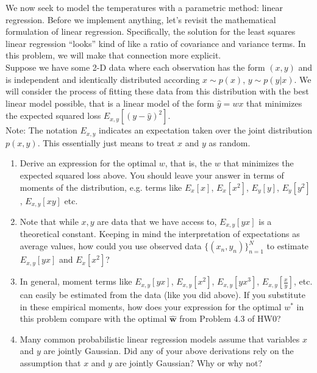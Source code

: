 \documentclass[submit]{harvardml}
\begin{document}
\newpage
\begin{problem}

We now seek to model the temperatures with a parametric method: linear regression. Before we implement anything, let's revisit the mathematical formulation of linear regression.  Specifically, the solution for the least squares linear regression  ``looks'' kind of like a ratio of covariance and
variance terms.  In this problem, we will make that connection more
explicit. \\

\noindent Suppose we have some 2-D data where each observation has the form $(x, y)$ and is independent and identically distributed according  $x \sim p(x)$, $y \sim p(y|x)$. We will consider the process of fitting these data from this distribution with the best linear model
possible, that is a linear model of the form $\hat{y} = wx$ that
minimizes the expected squared loss $E_{x,y}[ ( y - \hat{y} )^2
    ]$.\\

\noindent Note: The notation $E_{x, y}$ indicates an
expectation taken over the joint distribution $p(x,y)$. This essentially just means to treat $x$ and $y$ as random.  

\begin{enumerate}

  \item Derive an expression for the optimal $w$, that is, the $w$
        that minimizes the expected squared loss above.  You should leave
        your answer in terms of moments of the distribution, e.g. terms
        like $E_x[x]$, $E_x[x^2]$, $E_y[y]$, $E_y[y^2]$, $E_{x,y}[xy]$
        etc.

  \item Note that while $x, y$ are data that we have access to, $E_{x, y}[yx]$ is a theoretical constant. Keeping in mind the interpretation of expectations as average values, how could you use observed data $\{(x_n,y_n)\}_{n=1}^N$ to estimate $E_{x, y}[yx]$ and $E_x[x^2]$?

  \item In general, moment terms like $E_{x, y}[yx]$, $E_{x, y}[x^2]$,
        $E_{x, y}[yx^3]$, $E_{x, y}[\frac{x}{y}]$, etc. can easily be
        estimated from the data (like you did above).  If you substitute in
        these empirical moments, how does your expression for the optimal
        $w^*$ in this problem compare with the optimal $\bm{\hat w}$ from Problem 4.3 of HW0?

  \item Many common probabilistic linear regression models assume that
        variables $x$ and $y$ are jointly Gaussian.  Did any of your above
        derivations rely on the assumption that $x$ and $y$ are jointly
        Gaussian?  Why or why not?
\end{enumerate}
\end{problem}
\end{document}
